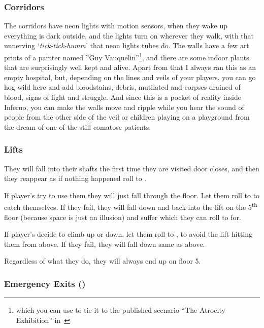 \subsubsection{Corridors}%
\label{ssub:Corridors}
The corridors have neon lights with motion sensors, when they wake up everything is dark outside, and the lights turn on
wherever they walk, with that unnerving ‘\textit{tick-tick-humm}’ that neon lights tubes do.  The walls have a few art prints of
a painter named ”Guy Vauquelin”\footnote{which you can use to tie it to the published scenario “The Atrocity Exhibition”
in~\cite[p.~94]{KULT:taroticum}}, and there are some indoor plants that are surprisingly well kept and alive.  Apart from that
I always ran this as an empty hospital, but, depending on the lines and veils of your players, you can go hog wild here and add
bloodstains, debris, mutilated and corpses drained of blood, signs of fight and struggle.  And since this is a pocket of reality
inside Inferno, you can make the walls move and ripple while you hear the sound of people from the other side of the veil or
children playing on a playground from the dream of one of the still comatose patients.

\subsubsection{Lifts}%
\label{ssub:lifts}

They will fall into their shafts the first time they are visited door closes, and then they reappear as if nothing happened
roll to .

If player's try to use them they will just fall through the floor.  Let them roll to  to catch
themselves.  If they fail, they will fall down and back into the lift on the 5\textsuperscript{th} floor (because space is
just an illusion) and suffer  which they can roll to  for.

If player's decide to climb up or down, let them roll to , to avoid the lift hitting them from
above.  If they fail, they will fall down same as above.

Regardless of what they do, they will always end up on floor 5.

\subsubsection{Emergency Exits (\faLock)}%
\label{ssub:emergency_exits}

